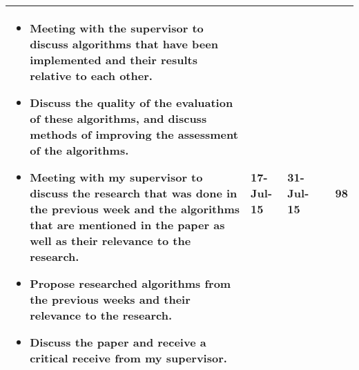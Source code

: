 \begin{longtable}{|>{\raggedleft\arraybackslash}m{50mm}|m{10mm}|m{10mm}|m{10mm}|m{30mm}|}
			\hline
				\begin{itemize}                                                                                                                                                                               
					\item Meeting with the supervisor to discuss algorithms that have been implemented and their results relative to each other.                                                                                   
					\item Discuss the quality of the evaluation of these algorithms, and discuss methods of improving the assessment of the algorithms.                                                                            
					\item Meeting with my supervisor to discuss the research that was done in the previous week and the algorithms that are mentioned in the paper as well as their relevance to the research.                     
					\item Propose researched algorithms from the previous weeks and their relevance to the research.                                                                                                               
					\item Discuss the paper and receive a critical receive from my supervisor.
				\end{itemize}     & 17-Jul-15  & 31-Jul-15 &                & 98\\
			\hline
                                                                                                                                                                             

\end{longtable}
